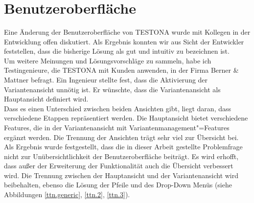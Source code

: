 \newpage
\section{Benutzeroberfläche}
\paragraph{}

Eine Änderung der Benutzeroberfläche von TESTONA wurde mit Kollegen in der Entwicklung offen diskutiert. Als Ergebnis konnten wir aus Sicht der Entwickler feststellen, dass die bisherige Lösung als gut und intuitiv zu bezeichnen ist.\\


Um weitere Meinungen und Lösungsvorschläge zu sammeln, habe ich Testingenieure, die TESTONA mit Kunden anwenden, in der Firma Berner \& Mattner befragt. Ein Ingenieur stellte fest, dass die Aktivierung der Variantenansicht unnötig ist. Er wünschte, dass die Variantenansicht als Hauptansicht definiert wird.\\


Dass es einen Unterschied zwischen beiden Ansichten gibt, liegt daran, dass verschiedene Etappen repräsentiert werden. Die Hauptansicht bietet verschiedene Features, die in der Variantenansicht mit Variantenmanagement"=Features ergänzt werden. Die Trennung der Ansichten trägt sehr viel zur Übersicht bei.\\


Als Ergebnis wurde festgestellt, dass die in dieser Arbeit gestellte Problemfrage nicht zur Unübersichtlichkeit der Benutzeroberfläche beiträgt. Es wird erhofft, dass außer der Erweiterung der Funktionalität auch die Übersicht verbessert wird. Die Trennung zwischen der Hauptansicht und der Variantenansicht wird beibehalten, ebenso die Lösung der Pfeile und des Drop-Down Menüs (siehe Abbildungen \ref{ttn.generic}, \ref{ttn.2}, \ref{ttn.3}).